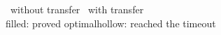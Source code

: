 \begin{figure}[t]
\centering
{\small
{}~\tool without transfer\quad
{}~\tool with transfer\\[1pt]
filled: proved optimal\quad hollow: reached the timeout\par}

\smallskip


\end{figure}
